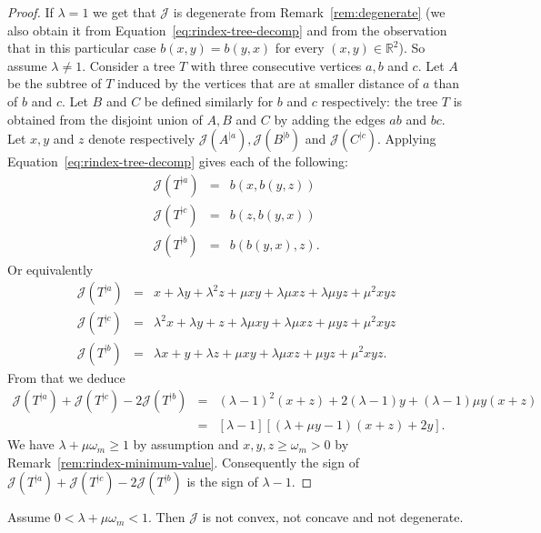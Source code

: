 \documentclass[11 pt]{modarticle}
\newcommand{\cR}{\mathbb{R}}
\newcommand{\wmin}{\omega_m}
\newcommand{\rtree}[2]{{#1}^{\lvert #2}}
\newcommand{\bilinear}{b}
\newcommand{\rindexsymbol}{\mathcal{J}}
\newcommand{\rindex}[2]{\rindexsymbol(\rtree{#2}{#1})}
\begin{document}
\begin{proof}
If $\lambda = 1$ we get that $\rindexsymbol$ is degenerate from Remark~\ref{rem:degenerate} (we also obtain it from Equation~\eqref{eq:rindex-tree-decomp} and from the observation that in this particular case $\bilinear(x,y) = \bilinear(y,x)$ for every $(x,y) \in \cR^2$). So assume $\lambda \neq 1$. Consider a tree $T$ with three consecutive vertices $a,b$ and $c$. Let $A$ be the subtree of $T$ induced by the vertices that are at smaller distance of $a$ than of $b$ and $c$. Let $B$ and $C$ be defined similarly for $b$ and $c$ respectively: the tree $T$ is obtained from the disjoint union of $A,B$ and $C$ by adding the edges $ab$ and $bc$. Let $x,y$ and $z$ denote respectively $\rindex{a}{A}, \rindex{b}{B}$ and $\rindex{c}{C}$. Applying Equation~\eqref{eq:rindex-tree-decomp} gives each of the following:
\begin{eqnarray*}
	\rindex{a}{T} & = & \bilinear(x,\bilinear(y,z)) \\
	\rindex{c}{T} & = & \bilinear(z,\bilinear(y,x)) \\
	\rindex{b}{T} & = & \bilinear(\bilinear(y,x),z).
\end{eqnarray*}
Or equivalently
\begin{eqnarray*}
	\rindex{a}{T} & = & x + \lambda y + \lambda^2 z + \mu xy + \lambda \mu xz + \lambda \mu yz + \mu^2 xyz \\
	\rindex{c}{T} & = & \lambda^2 x + \lambda y + z + \lambda \mu xy + \lambda \mu xz + \mu yz + \mu^2 xyz \\
	\rindex{b}{T} & = & \lambda x + y + \lambda z + \mu xy + \lambda \mu xz + \mu yz + \mu^2 xyz.
\end{eqnarray*}
From that we deduce
\begin{eqnarray}
	\rindex{a}{T} + \rindex{c}{T} - 2 \rindex{b}{T} & = & (\lambda-1)^2 (x + z) + 2 (\lambda - 1) y + (\lambda-1) \mu y (x+z) \nonumber \\
	& = & [\lambda - 1][(\lambda + \mu y - 1)(x+z) + 2y]. \label{eq:convexity}
\end{eqnarray}
We have $\lambda + \mu \wmin \geq 1$ by assumption and $x,y,z \geq \wmin > 0$ by Remark~\ref{rem:rindex-minimum-value}. Consequently the sign of $\rindex{a}{T} + \rindex{c}{T} - 2 \rindex{b}{T}$ is the sign of $\lambda - 1$.
\end{proof}

\begin{prop}
Assume $0 < \lambda + \mu \wmin < 1$. Then $\rindexsymbol$ is not convex, not concave and not degenerate.
\end{prop}
\end{document}
